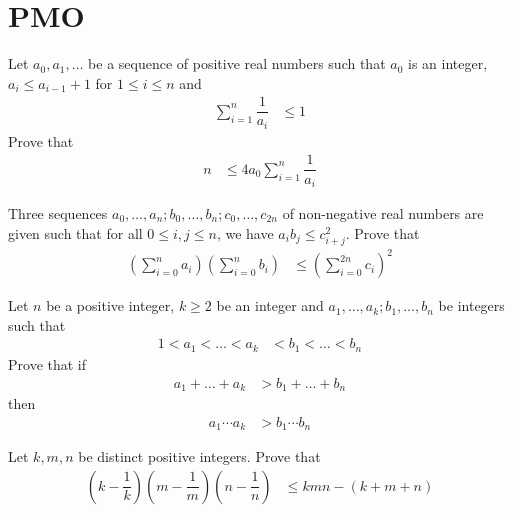 \documentclass{subfile}
\begin{document}
	\section{PMO}\label{sec:pmo}
	
		\begin{problem}
			Let $a_{0},a_{1},\ldots$ be a sequence of positive real numbers such that $a_{0}$ is an integer, $a_{i}\leq a_{i-1}+1$ for $1\leq i\leq n$ and
				\begin{align*}
					\sum_{i=1}^{n}\dfrac{1}{a_{i}}
						& \leq 1
				\end{align*}
			Prove that
				\begin{align*}
					n
						& \leq 4a_{0}\sum_{i=1}^{n}\dfrac{1}{a_{i}}
				\end{align*}
		\end{problem}
	
		\begin{problem}
			Three sequences $a_{0},\ldots,a_{n};b_{0},\ldots,b_{n};c_{0},\ldots,c_{2n}$ of non-negative real numbers are given such that for all $0\leq i,j\leq n$, we have $a_{i}b_{j}\leq c_{i+j}^{2}$. Prove that
				\begin{align*}
					\left(\sum_{i=0}^{n}a_{i}\right)\left(\sum_{i=0}^{n}b_{i}\right)
						& \leq \left(\sum_{i=0}^{2n}c_{i}\right)^{2}
				\end{align*}
		\end{problem}
	
		\begin{problem}
			Let $n$ be a positive integer, $k\geq2$ be an integer and $a_{1},\ldots,a_{k};b_{1},\ldots,b_{n}$ be integers such that
				\begin{align*}
					1<a_{1}<\ldots<a_{k}
						& < b_{1}<\ldots<b_{n}
				\end{align*}
			Prove that if
				\begin{align*}
					a_{1}+\ldots+a_{k}
						& > b_{1}+\ldots+b_{n}
				\end{align*}
			then
				\begin{align*}
					a_{1}\cdots a_{k}
						& > b_{1}\cdots b_{n}
				\end{align*}
		\end{problem}
	
		\begin{problem}
			Let $k,m,n$ be distinct positive integers. Prove that
				\begin{align*}
					\left(k-\dfrac{1}{k}\right)\left(m-\dfrac{1}{m}\right)\left(n-\dfrac{1}{n}\right)
						& \leq kmn-(k+m+n)
				\end{align*}
		\end{problem}
	
\end{document}
